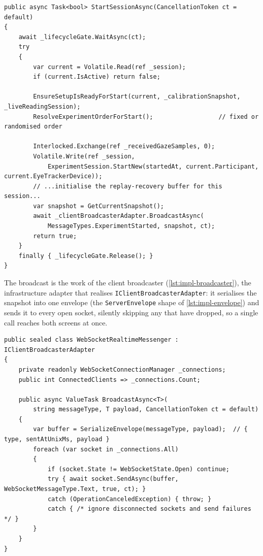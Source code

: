 \begin{listing}[htbp]
\begin{verbatim}
public async Task<bool> StartSessionAsync(CancellationToken ct = default)
{
    await _lifecycleGate.WaitAsync(ct);
    try
    {
        var current = Volatile.Read(ref _session);
        if (current.IsActive) return false;

        EnsureSetupIsReadyForStart(current, _calibrationSnapshot, _liveReadingSession);
        ResolveExperimentOrderForStart();                  // fixed or randomised order

        Interlocked.Exchange(ref _receivedGazeSamples, 0);
        Volatile.Write(ref _session,
            ExperimentSession.StartNew(startedAt, current.Participant, current.EyeTrackerDevice));
        // ...initialise the replay-recovery buffer for this session...
        var snapshot = GetCurrentSnapshot();
        await _clientBroadcasterAdapter.BroadcastAsync(
            MessageTypes.ExperimentStarted, snapshot, ct);
        return true;
    }
    finally { _lifecycleGate.Release(); }
}
\end{verbatim}
\caption{Session start (abbreviated from \texttt{ExperimentSessionManager.Lifecycle.cs}). Re-checks all readiness gates at the moment of commit before publishing and broadcasting the snapshot.}
\label{lst:impl-start}
\end{listing}

The broadcast is the work of the client broadcaster (\cref{lst:impl-broadcaster}), the infrastructure adapter that realises \texttt{IClientBroadcasterAdapter}: it serialises the snapshot into one envelope (the \texttt{ServerEnvelope} shape of \cref{lst:impl-envelope}) and sends it to every open socket, silently skipping any that have dropped, so a single call reaches both screens at once.

\begin{listing}[htbp]
\begin{verbatim}
public sealed class WebSocketRealtimeMessenger : IClientBroadcasterAdapter
{
    private readonly WebSocketConnectionManager _connections;
    public int ConnectedClients => _connections.Count;

    public async ValueTask BroadcastAsync<T>(
        string messageType, T payload, CancellationToken ct = default)
    {
        var buffer = SerializeEnvelope(messageType, payload);  // { type, sentAtUnixMs, payload }
        foreach (var socket in _connections.All)
        {
            if (socket.State != WebSocketState.Open) continue;
            try { await socket.SendAsync(buffer, WebSocketMessageType.Text, true, ct); }
            catch (OperationCanceledException) { throw; }
            catch { /* ignore disconnected sockets and send failures */ }
        }
    }
}
\end{verbatim}
\caption{Client broadcaster (abbreviated from \texttt{ReadingTheReader.RealtimeMessenger}). Realises \texttt{IClientBroadcasterAdapter}: one serialised envelope fanned out to every open socket.}
\label{lst:impl-broadcaster}
\end{listing}

